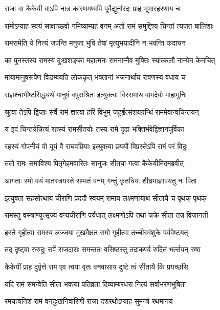 \twolineshloka
{राजा वा कैकेयी वाऽपि नात्र कारणमण्वपि}
{पूर्वेद्युर्नारदः प्राह भूभारहरणाय च} %

\twolineshloka
{रामोऽप्याह स्वयं साक्षाच्छ्वो गमिष्याम्यहं वनम्}
{अतो रामं समुद्दिश्य चिन्तां त्यजत बालिशाः} %

\twolineshloka
{रामरामेति ये नित्यं जपन्ति मनुजा भुवि}
{तेषां मृत्युभयादीनि न भवन्ति कदाचन} %

\twolineshloka
{का पुनस्तस्य रामस्य दुःखशङ्का महात्मनः}
{रामनाम्नैव मुक्तिः स्यात्कलौ नान्येन केनचित्} %

\twolineshloka
{मायामानुषरूपेण विडम्बयति लोककृत्}
{भक्तानां भजनार्थाय रावणस्य वधाय च} %

\twolineshloka
{राज्ञश्चाभीष्टसिद्ध्यर्थं मानुषं वपुराश्रितः}
{इत्युक्त्वा विररामाथ वामदेवो माहामुनिः} %

\twolineshloka
{श्रुत्वा तेऽपि द्विजाः सर्वे रामं ज्ञात्वा हरिं विभुम्}
{जहुर्हृत्संशयग्रन्थिं राममेवान्वचिन्तयन्} %

\twolineshloka
{य इदं चिन्तयेन्नित्यं रहस्यं रामसीतयोः}
{तस्य रामे दृढा भक्तिर्भवेद्विज्ञानपूर्विका} %

\twolineshloka
{रहस्यं गोपनीयं वो यूयं वै राघवप्रियाः}
{इत्युक्त्वा प्रययौ विप्रस्तेऽपि रामं परं विदुः} %

\twolineshloka
{ततो रामः समाविश्य पितृगेहमवारितः}
{सानुजः सीतया गत्वा कैकेयीमिदमब्रवीत्} %

\twolineshloka
{आगताः स्मो वयं मातस्त्रयस्ते सम्मतं वनम्}
{गन्तुं कृतधियः शीघ्रमाज्ञापयतु नः पिता} %

\twolineshloka
{इत्युक्ता सहसोत्थाय चीराणि प्रददौ स्वयम्}
{रामाय लक्ष्मणायाथ सीतायै च पृथक् पृथक्} %

\twolineshloka
{रामस्तु वस्त्राण्युत्सृज्य वन्यचीराणि पर्यधात्}
{लक्ष्मणोऽपि तथा चक्रे सीता तन्न विजानती} %

\twolineshloka
{हस्ते गृहीत्वा रामस्य लज्जया मुखमैक्षत}
{रामो गृहीत्वा तच्चीरमंशुके पर्यवेष्टयत्} %

\twolineshloka
{तद् दृष्ट्वा रुरुदुः सर्वे राजदाराः समन्ततः}
{वसिष्ठस्तु तदाकर्ण्य रुदितं भर्त्सयन् रुषा} %

\twolineshloka
{कैकेयीं प्राह दुर्वृत्ते राम एव त्वया वृतः}
{वनवासाय दुष्टे त्वं सीतायै किं प्रयच्छसि} %

\twolineshloka
{यदि रामं समन्वेति सीता भक्त्या पतिव्रता}
{दिव्याम्बरधरा नित्यं सर्वाभरणभूषिता} %

\twolineshloka
{रमयत्वनिशं रामं वनदुःखनिवारिणी}
{राजा दशरथोऽप्याह सुमन्त्रं रथमानय} %

